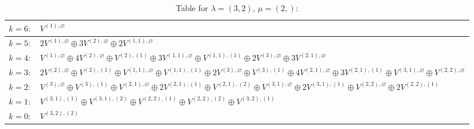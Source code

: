 \documentclass[a4paper,12pt]{article}
\begin{document}
\renewcommand{\arraystretch}{1.6} 
\begin{table}[H]
\centering
\caption{Table for $\lambda = (3, 2)$, $\mu = (2,)$:}
\begin{tabular}{|>{\centering\arraybackslash}p{15cm}|}
\hline
 $k = 6: \quad V^{(1), \varnothing} $ \\ \hline
 $k = 5: \quad 2 V^{(1), \varnothing} \oplus 3 V^{(2), \varnothing} \oplus 2 V^{(1, 1), \varnothing} $ \\ \hline
 $k = 4: \quad V^{(1), \varnothing} \oplus 4 V^{(2), \varnothing} \oplus V^{(2), (1)} \oplus 3 V^{(1, 1), \varnothing} \oplus V^{(1, 1), (1)} \oplus 2 V^{(3), \varnothing} \oplus 3 V^{(2, 1), \varnothing} $ \\ \hline
 $k = 3: \quad 2 V^{(2), \varnothing} \oplus V^{(2), (1)} \oplus V^{(1, 1), \varnothing} \oplus V^{(1, 1), (1)} \oplus 2 V^{(3), \varnothing} \oplus V^{(3), (1)} \oplus 4 V^{(2, 1), \varnothing} \oplus 3 V^{(2, 1), (1)} \oplus V^{(3, 1), \varnothing} \oplus V^{(2, 2), \varnothing} $ \\ \hline
 $k = 2: \quad V^{(3), \varnothing} \oplus V^{(3), (1)} \oplus V^{(2, 1), \varnothing} \oplus 2 V^{(2, 1), (1)} \oplus V^{(2, 1), (2)} \oplus V^{(3, 1), \varnothing} \oplus 2 V^{(3, 1), (1)} \oplus V^{(2, 2), \varnothing} \oplus 2 V^{(2, 2), (1)} $ \\ \hline
 $k = 1: \quad V^{(3, 1), (1)} \oplus V^{(3, 1), (2)} \oplus V^{(2, 2), (1)} \oplus V^{(2, 2), (2)} \oplus V^{(3, 2), (1)} $ \\ \hline
 $k = 0: \quad V^{(3, 2), (2)} $ \\ \hline
\end{tabular}
\end{table}
\end{document}
